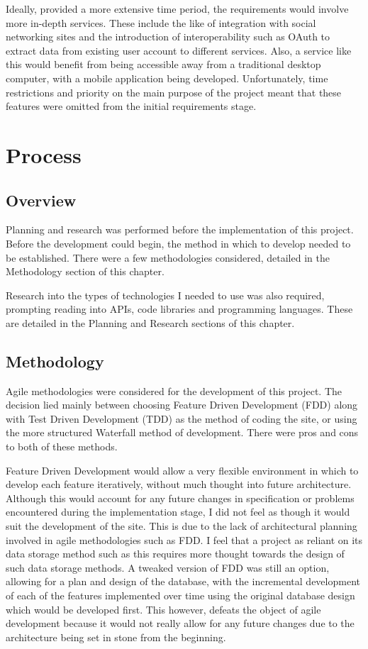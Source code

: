 Ideally, provided a more extensive time period, the requirements would involve more in-depth services. These include the like of integration with social networking sites and the introduction of interoperability such as OAuth\cite{oauth} to extract data from existing user account to different services. Also, a service like this would benefit from being accessible away from a traditional desktop computer, with a mobile application being developed. Unfortunately, time restrictions and priority on the main purpose of the project meant that these features were omitted from the initial requirements stage.

\section{Process}
\subsection{Overview}
Planning and research was performed before the implementation of this project. Before the development could begin, the method in which to develop needed to be established. There were a few methodologies considered, detailed in the Methodology section of this chapter.

Research into the types of technologies I needed to use was also required, prompting reading into APIs, code libraries and programming languages. These are detailed in the Planning and Research sections of this chapter.

\subsection{Methodology}
Agile methodologies were considered for the development of this project. The decision lied mainly between choosing Feature Driven Development (FDD) along with Test Driven Development (TDD) as the method of coding the site, or using the more structured Waterfall method of development. There were pros and cons to both of these methods. 

Feature Driven Development would allow a very flexible environment in which to develop each feature iteratively, without much thought into future architecture. Although this would account for any future changes in specification or problems encountered during the implementation stage, I did not feel as though it would suit the development of the site. This is due to the lack of architectural planning involved in agile methodologies such as FDD. I feel that a project as reliant on its data storage method such as this requires more thought towards the design of such data storage methods. A tweaked version of FDD was still an option, allowing for a plan and design of the database, with the incremental development of each of the features implemented over time using the original database design which would be developed first. This however, defeats the object of agile development because it would not really allow for any future changes due to the architecture being set in stone from the beginning.

